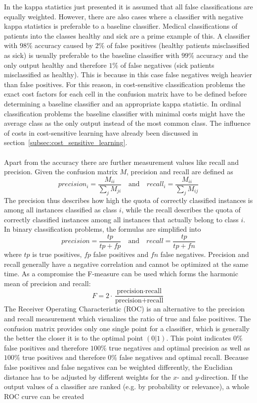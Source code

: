 \documentclass[article,type=msc,colorback,accentcolor=tud7b]{tudthesis}
\begin{document}
    In the kappa statistics just presented it is assumed that all false classifications are equally weighted. However, there are also cases where a classifier with negative kappa statistics is preferable to a baseline classifier. Medical classifications of patients into the classes healthy and sick are a prime example of this. A classifier with $98\%$ accuracy caused by $2\%$ of false positives (healthy patients misclassified as sick) is usually preferable to the baseline classifier with $99\%$ accuracy and the only output healthy and therefore $1\%$ of false negatives (sick patients misclassified as healthy). This is because in this case false negatives weigh heavier than false positives. For this reason, in cost-sensitive classification problems the exact cost factors for each cell in the confusion matrix have to be defined before determining a baseline classifier and an appropriate kappa statistic. In ordinal classification problems the baseline classifier with minimal costs might have the average class as the only output instead of the most common class. The influence of costs in cost-sensitive learning have already been discussed in section~\ref{subsec:cost_sensitive_learning}. \\\\
    Apart from the accuracy there are further measurement values like recall and precision. Given the confusion matrix $M$, precision and recall are defined as
    \[precision_{i}=\frac{M_{i i}}{\sum_{j}M_{ji}} \quad \textrm{and} \quad recall_{i}=\frac{M_{i i}}{\sum_{j}M_{ij}}\]
    The precision thus describes how high the quota of correctly classified instances is among all instances classified as class $i$, while the recall describes the quota of correctly classified instances among all instances that actually belong to class $i$. In binary classification problems, the formulas are simplified into
    \[precision=\frac{tp}{tp+fp} \quad \textrm{and} \quad recall=\frac{tp}{tp+fn}\]
    where $tp$ is true positives, $fp$ false positives and $fn$ false negatives. Precision and recall generally have a negative correlation and cannot be optimized at the same time. As a compromise the F-measure can be used which forms the harmonic mean of precision and recall:
    \[F=2\cdot\frac{\text{precision}\cdot\text{recall}}{\text{precision}+\text{recall}}\]
    The Receiver Operating Characteristic (ROC) is an alternative to the precision and recall measurement which visualizes the ratio of true and false positives. The confusion matrix provides only one single point for a classifier, which is generally the better the closer it is to the optimal point $(0|1)$. This point indicates $0\%$ false positives and therefore $100\%$ true negatives and optimal precision as well as $100\%$ true positives and therefore $0\%$ false negatives and optimal recall. Because false positives and false negatives can be weighted differently, the Euclidian distance has to be adjusted by different weights for the $x$- and $y$-direction. If the output values of a classifier are ranked (e.g. by probability or relevance), a whole ROC curve can be created
\end{document}
